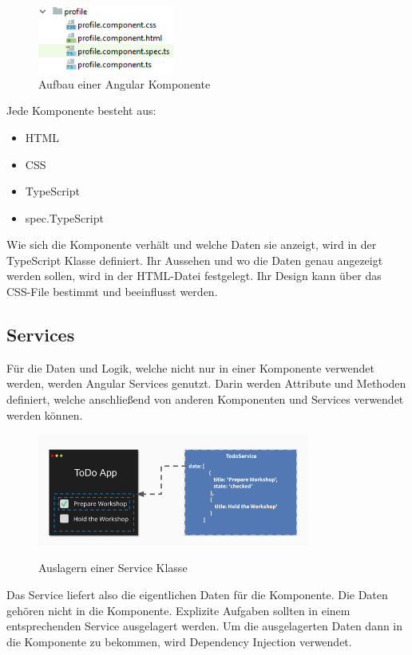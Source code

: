 \begin{figure}[h]
    \centering
    \includegraphics[width=0.4\textwidth]{pics/Aufbau_Komponente.png}
    \caption{Aufbau einer Angular Komponente}
\end{figure}
\newpage
Jede Komponente besteht aus:

\begin{itemize}
    \item HTML
    \item CSS
    \item TypeScript
    \item spec.TypeScript 
\end{itemize}

Wie sich die Komponente verhält und welche Daten sie anzeigt, wird in der TypeScript Klasse definiert. Ihr Aussehen und wo die Daten genau angezeigt werden sollen, wird in der HTML-Datei festgelegt. Ihr Design kann über das CSS-File bestimmt und beeinflusst werden.
\cite{AngularKomponenten}

\subsection{Services}
Für die Daten und Logik, welche nicht nur in einer Komponente verwendet werden, werden Angular Services genutzt. Darin werden Attribute und Methoden definiert, welche anschließend von anderen Komponenten und Services verwendet werden können.

\begin{figure}[h]
    \centering
    \includegraphics[width=0.8\textwidth]{pics/Service_Klasse.png}
    \caption{Auslagern einer Service Klasse}
    \cite{Service}
\end{figure}

Das Service liefert also die eigentlichen Daten für die Komponente. Die Daten gehören nicht in die Komponente. Explizite Aufgaben sollten in einem entsprechenden Service ausgelagert werden. Um die ausgelagerten Daten dann in die Komponente zu bekommen, wird Dependency Injection verwendet.
\newpage

